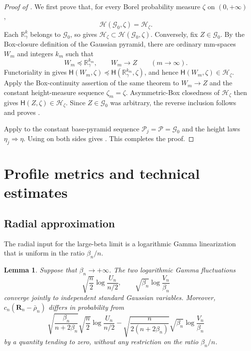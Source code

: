 \documentclass{amsart}
\numberwithin{equation}{section}
\theoremstyle{plain}
\newtheorem{lemma}[theorem]{Lemma}
\theoremstyle{definition}
\theoremstyle{remark}
\begin{document}
\begin{proof}[Proof of ]
We first prove that, for every Borel probability measure $\zeta$ on $(0,+\infty)$,
\begin{equation}\label{eq:Gaussian-base-joint-specialization}
 \mathcal H(\mathcal G_0,\zeta)=\mathcal H_\zeta.
\end{equation}
Each $\mathbb R_\gamma^k$ belongs to $\mathcal G_0$, so
 gives
$\mathcal H_\zeta\subset\mathcal H(\mathcal G_0,\zeta)$.  Conversely, fix $Z\in\mathcal G_0$.  By the Box-closure
definition of the Gaussian pyramid, there are ordinary mm-spaces $W_m$ and integers $k_m$ such that
\[
 W_m\preceq\mathbb R_\gamma^{k_m},
 \qquad
 W_m\longrightarrow Z
 \qquad(m\to\infty).
\]
Functoriality in  gives
$\mathsf H(W_m,\zeta)\preceq\mathsf H(\mathbb R_\gamma^{k_m},\zeta)$, and hence
$\mathsf H(W_m,\zeta)\in\mathcal H_\zeta$.  Apply the Box-continuity assertion of the same theorem to
$W_m\to Z$ and the constant height-measure sequence $\zeta_m=\zeta$.  Asymmetric-Box closedness of
$\mathcal H_\zeta$ then gives $\mathsf H(Z,\zeta)\in\mathcal H_\zeta$.  Since $Z\in\mathcal G_0$ was arbitrary,
the reverse inclusion follows and proves .

Apply  to the constant base-pyramid sequence
$\mathcal P_j=\mathcal P=\mathcal G_0$ and the height laws $\eta_j\Rightarrow\eta$.  Using
 on both sides gives
.  This completes the proof.
\end{proof}

\section{Profile metrics and technical estimates}\label{app:profile-estimates}

\subsection{Radial approximation}

The radial input for the large-beta limit is a logarithmic Gamma linearization that is uniform in the ratio $\beta_n/n$.

\begin{lemma}\label{lem:radial-linearization}
Suppose that $\beta_n\to+\infty$.  The two logarithmic Gamma fluctuations
\[ \sqrt{\frac n2}\log\frac{U_n}{n/2}, \qquad \sqrt{\beta_n}\log\frac{V_n}{\beta_n} \]
converge jointly to independent standard Gaussian variables.  Moreover,
$c_n(\mathbf R_n-\bar\rho_n)$ differs in probability from
\begin{equation}\label{eq:radial-linear-part} \sqrt{\frac{\beta_n}{n+2\beta_n}} \sqrt{\frac n2}\log\frac{U_n}{n/2} -\sqrt{\frac{n}{2(n+2\beta_n)}} \sqrt{\beta_n}\log\frac{V_n}{\beta_n} \end{equation}
by a quantity tending to zero, without any restriction on the ratio $\beta_n/n$.
\end{lemma}
\end{document}
